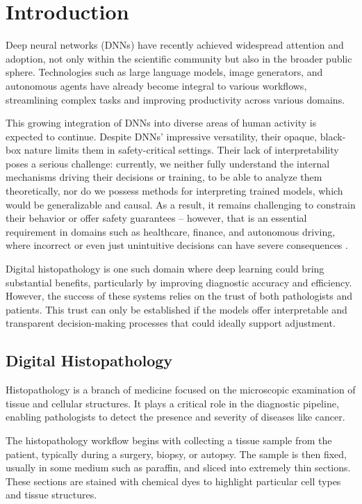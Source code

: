 \chapter{Introduction}

Deep neural networks (DNNs) have recently achieved widespread attention and adoption,
not only within the scientific community but also in the broader public sphere.
Technologies such as large language models, image generators, and autonomous agents
have already become integral to various workflows,
streamlining complex tasks and improving productivity across various domains.

This growing integration of DNNs into diverse areas of human activity is expected to continue.
Despite DNNs' impressive versatility, their opaque, black-box nature limits them in safety-critical settings.
Their lack of interpretability poses a serious challenge: currently, we neither fully understand the internal mechanisms driving their decisions or training,
to be able to analyze them theoretically, nor do we possess methods for interpreting trained models, which would be generalizable and causal.
As a result, it remains challenging to constrain their behavior or offer safety guarantees -- however, that is an essential requirement in domains such as healthcare, finance, and autonomous driving, where incorrect or even just unintuitive decisions can have severe consequences \cite{linardatos2020explainable}.

Digital histopathology is one such domain where deep learning could bring substantial benefits,
particularly by improving diagnostic accuracy and efficiency.
However, the success of these systems relies on the trust of both pathologists and patients.
This trust can only be established if the models offer interpretable and transparent decision-making processes that could ideally support adjustment.


\newpage
\section{Digital Histopathology}

Histopathology is a branch of medicine focused on the microscopic examination of tissue and cellular structures.
It plays a critical role in the diagnostic pipeline, enabling pathologists to detect the presence and severity of diseases like cancer.

The histopathology workflow begins with collecting a tissue sample from the patient,
typically during a surgery, biopsy, or autopsy. The sample is then fixed, usually in some medium such as paraffin,
and sliced into extremely thin sections. These sections are stained with chemical dyes to highlight particular cell types and tissue structures.

